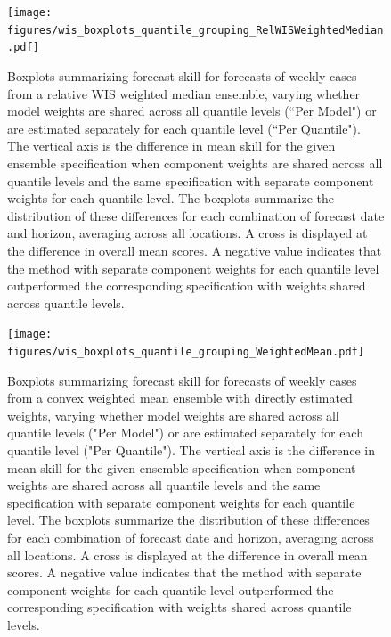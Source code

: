 \documentclass{article}
\begin{document}
\begin{figure}[H]
  \texttt{[image: figures/wis\_boxplots\_quantile\_grouping\_RelWISWeightedMedian.pdf]}
  \caption{Boxplots summarizing forecast skill for forecasts of weekly cases from a relative WIS weighted median ensemble, varying whether model weights are shared across all quantile levels (``Per Model") or are estimated separately for each quantile level (``Per Quantile").
  The vertical axis is the difference in mean skill for the given ensemble specification when component weights are shared across all quantile levels and the same specification with separate component weights for each quantile level.
  The boxplots summarize the distribution of these differences for each combination of forecast date and horizon, averaging across all locations.
  A cross is displayed at the difference in overall mean scores.
  A negative value indicates that the method with separate component weights for each quantile level outperformed the corresponding specification with weights shared across quantile levels.}
  \label{fig:wis_quantile_grouping_rel_wis}
\end{figure}

\begin{figure}[H]
  \texttt{[image: figures/wis\_boxplots\_quantile\_grouping\_WeightedMean.pdf]}
  \caption{Boxplots summarizing forecast skill for forecasts of weekly cases from a convex weighted mean ensemble with directly estimated weights, varying whether model weights are shared across all quantile levels ("Per Model") or are estimated separately for each quantile level ("Per Quantile").
  The vertical axis is the difference in mean skill for the given ensemble specification when component weights are shared across all quantile levels and the same specification with separate component weights for each quantile level.
  The boxplots summarize the distribution of these differences for each combination of forecast date and horizon, averaging across all locations.
  A cross is displayed at the difference in overall mean scores.
  A negative value indicates that the method with separate component weights for each quantile level outperformed the corresponding specification with weights shared across quantile levels.}
  \label{fig:wis_quantile_grouping_convex}
\end{figure}
\end{document}

